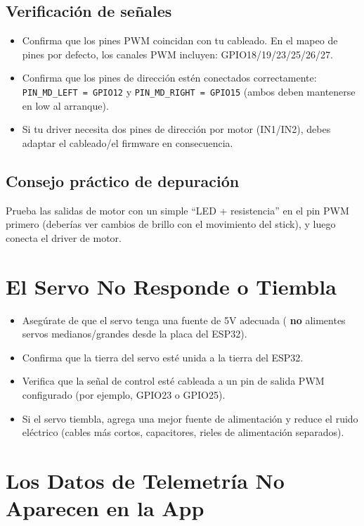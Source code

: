 \subsection*{Verificación de señales}
\begin{itemize}
    \item Confirma que los pines PWM coincidan con tu cableado. En el mapeo de pines por defecto, los canales PWM incluyen:
    GPIO18/19/23/25/26/27.
    \item Confirma que los pines de dirección estén conectados correctamente:
    \texttt{PIN\_MD\_LEFT = GPIO12} y \texttt{PIN\_MD\_RIGHT = GPIO15} (ambos deben mantenerse en low al arranque).
    \item Si tu driver necesita dos pines de dirección por motor (IN1/IN2), debes adaptar el cableado/el firmware en consecuencia.
\end{itemize}

\subsection*{Consejo práctico de depuración}
Prueba las salidas de motor con un simple ``LED + resistencia'' en el pin PWM primero (deberías ver cambios de brillo con el movimiento del stick),
y luego conecta el driver de motor.

\section{El Servo No Responde o Tiembla}
\label{sec:servo}

\begin{itemize}
    \item Asegúrate de que el servo tenga una fuente de 5V adecuada ( \textbf{no} alimentes servos medianos/grandes desde la placa del ESP32).
    \item Confirma que la tierra del servo esté unida a la tierra del ESP32.
    \item Verifica que la señal de control esté cableada a un pin de salida PWM configurado (por ejemplo, GPIO23 o GPIO25).
    \item Si el servo tiembla, agrega una mejor fuente de alimentación y reduce el ruido eléctrico (cables más cortos, capacitores, rieles de alimentación separados).
\end{itemize}

\section{Los Datos de Telemetría No Aparecen en la App}
\label{sec:telemetry}

